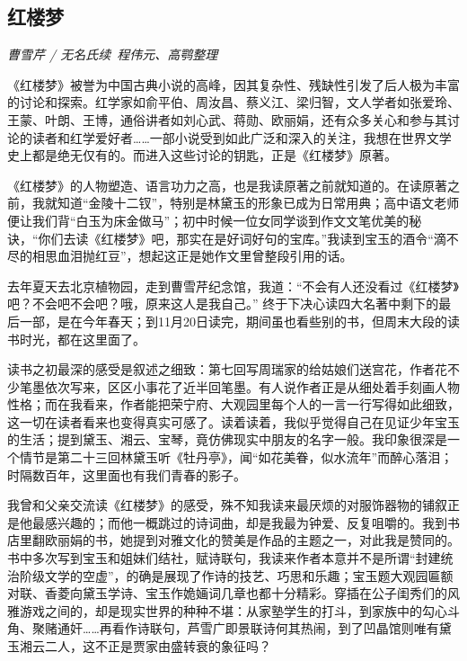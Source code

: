 \subsection*{红楼梦}
\par \emph{曹雪芹 / 无名氏续\  程伟元、高鹗整理} 
\par 《红楼梦》被誉为中国古典小说的高峰，因其复杂性、残缺性引发了后人极为丰富的讨论和探索。红学家如俞平伯、周汝昌、蔡义江、梁归智，文人学者如张爱玲、王蒙、叶朗、王博，通俗讲者如刘心武、蒋勋、欧丽娟，还有众多关心和参与其讨论的读者和红学爱好者……一部小说受到如此广泛和深入的关注，我想在世界文学史上都是绝无仅有的。而进入这些讨论的钥匙，正是《红楼梦》原著。
\par 《红楼梦》的人物塑造、语言功力之高，也是我读原著之前就知道的。在读原著之前，我就知道“金陵十二钗”，特别是林黛玉的形象已成为日常用典；高中语文老师便让我们背“白玉为床金做马”；初中时候一位女同学谈到作文文笔优美的秘诀，“你们去读《红楼梦》吧，那实在是好词好句的宝库。”我读到宝玉的酒令“滴不尽的相思血泪抛红豆”，想起这正是她作文里曾整段引用的话。
\par 去年夏天去北京植物园，走到曹雪芹纪念馆，我道：“不会有人还没看过《红楼梦》吧？不会吧不会吧？哦，原来这人是我自己。” 终于下决心读四大名著中剩下的最后一部，是在今年春天；到11月20日读完，期间虽也看些别的书，但周末大段的读书时光，都在这里面了。
\par 读书之初最深的感受是叙述之细致：第七回写周瑞家的给姑娘们送宫花，作者花不少笔墨依次写来，区区小事花了近半回笔墨。有人说作者正是从细处着手刻画人物性格；而在我看来，作者能把荣宁府、大观园里每个人的一言一行写得如此细致，这一切在读者看来也变得真实可感了。读着读着，我似乎觉得自己在见证少年宝玉的生活；提到黛玉、湘云、宝琴，竟仿佛现实中朋友的名字一般。我印象很深是一个情节是第二十三回林黛玉听《牡丹亭》，闻“如花美眷，似水流年”而醉心落泪；时隔数百年，这里面也有我们青春的影子。
\par 我曾和父亲交流读《红楼梦》的感受，殊不知我读来最厌烦的对服饰器物的铺叙正是他最感兴趣的；而他一概跳过的诗词曲，却是我最为钟爱、反复咀嚼的。我到书店里翻欧丽娟的书，她提到对雅文化的赞美是作品的主题之一，对此我是赞同的。书中多次写到宝玉和姐妹们结社，赋诗联句，我读来作者本意并不是所谓“封建统治阶级文学的空虚”，的确是展现了作诗的技艺、巧思和乐趣；宝玉题大观园匾额对联、香菱向黛玉学诗、宝玉作{姽婳}词几章也都十分精彩。穿插在公子闺秀们的风雅游戏之间的，却是现实世界的种种不堪：从家塾学生的打斗，到家族中的勾心斗角、聚赌通奸……再看作诗联句，芦雪广即景联诗何其热闹，到了凹晶馆则唯有黛玉湘云二人，这不正是贾家由盛转衰的象征吗？
